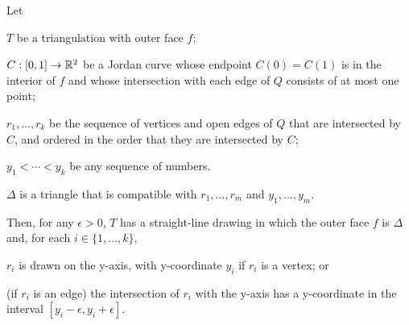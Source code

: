 \documentclass{patmorin}
\begin{document}
\begin{thm}
   Let
   \begin{compactenum}
     \item  $T$ be a triangulation with outer face $f$;
     \item  $C:[0,1]\to\mathbb{R}^2$ be a Jordan curve whose endpoint $C(0)=C(1)$
            is in the interior of $f$ and whose intersection with each
            edge of $Q$ consists of at most one point;
     \item $r_1,\ldots,r_k$ be the sequence of vertices and open edges
           of $Q$ that are intersected by $C$, and ordered in the order
           that they are intersected by $C$;
     \item $y_1<\cdots<y_k$ be any sequence of numbers.  
     \item $\Delta$ is a triangle that is compatible with 
           $r_1,\ldots,r_m$ and $y_1,\ldots,y_m$.
  \end{compactenum}
   Then, for any $\epsilon>0$, $T$ has a
   straight-line drawing in which the outer face $f$ is $\Delta$
   and, for each $i\in\{1,\ldots,k\}$, 
   \begin{compactenum}
       \item $r_i$ is drawn on the y-axis, with y-coordinate $y_i$
         if $r_i$ is a vertex; or
       \item (if $r_i$ is an edge) the intersection of $r_i$ with the
         y-axis has a y-coordinate in the interval
         $[y_i-\epsilon,y_i+\epsilon]$.
   \end{compactenum}
\end{thm}
\end{document}
